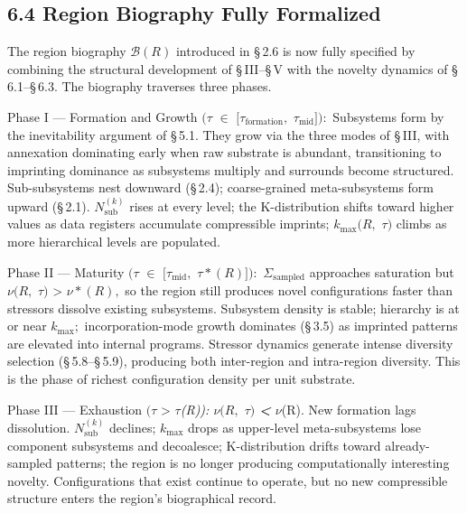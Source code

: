 \documentclass[11pt,oneside]{report}
\theoremstyle{definition}
\theoremstyle{remark}
\begin{document}
\subsection*{6.4 Region Biography Fully Formalized}

The region biography \ensuremath{\mathcal{B}(R)} introduced in \S\,2.6 is now fully specified by
combining the structural development of \S\,III--\S\,V with the novelty
dynamics of \S\,6.1--\S\,6.3. The biography traverses three phases.

Phase I --- Formation and Growth \ensuremath{(\tau} \ensuremath{\in} \ensuremath{[\tau_{\mathrm{formation}},} \ensuremath{\tau_{\mathrm{mid}}]):}
Subsystems form by the inevitability argument of \S\,5.1. They grow via the
three modes of \S\,III, with annexation dominating early when raw substrate
is abundant, transitioning to imprinting dominance as subsystems
multiply and surrounds become structured. Sub-subsystems nest downward
(\S\,2.4); coarse-grained meta-subsystems form upward (\S\,2.1). \ensuremath{N_{\mathrm{sub}}^{(k)}}
rises at every level; the K-distribution shifts toward higher values as
data registers accumulate compressible imprints; \ensuremath{k_{\mathrm{max}}(R,} \ensuremath{\tau )} climbs as
more hierarchical levels are populated.

Phase II --- Maturity \ensuremath{(\tau} \ensuremath{\in} \ensuremath{[\tau_{\mathrm{mid}},} \ensuremath{\tau *(R)]):} \ensuremath{\Sigma_{\mathrm{sampled}}} approaches
saturation but \ensuremath{\nu (R,} \ensuremath{\tau )} \textgreater{} \ensuremath{\nu *(R),} so the region still
produces novel configurations faster than stressors dissolve existing
subsystems. Subsystem density is stable; hierarchy is at or near \ensuremath{k_{\mathrm{max}};}
incorporation-mode growth dominates (\S\,3.5) as imprinted patterns are
elevated into internal programs. Stressor dynamics generate intense
diversity selection (\S\,5.8--\S\,5.9), producing both inter-region and
intra-region diversity. This is the phase of richest configuration
density per unit substrate.

Phase III --- Exhaustion \ensuremath{(\tau} \textgreater{} \ensuremath{\tau}\emph{(R)): \ensuremath{\nu (R,} \ensuremath{\tau )}
\textbf{\textless{}} \ensuremath{\nu}}(R). New formation lags dissolution.
\ensuremath{N_{\mathrm{sub}}^{(k)}} declines; \ensuremath{k_{\mathrm{max}}} drops as upper-level meta-subsystems lose
component subsystems and decoalesce; K-distribution drifts toward
already-sampled patterns; the region is no longer producing
computationally interesting novelty. Configurations that exist continue
to operate, but no new compressible structure enters the region's
biographical record.
\end{document}
